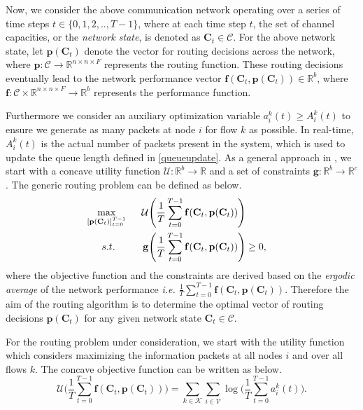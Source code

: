 \documentclass[lettersize,journal]{IEEEtran}
\begin{document}
Now, we consider the above communication network operating over a series of time steps $t \in \{0, 1, 2,..,T-1 \}$, where at each time step $t$, the set of channel capacities, or the \textit{network state}, is denoted as $\mathbf{C}_t \in \mathcal{C}$. For the above network state, let $\mathbf{p}(\mathbf{C}_t)$ denote the vector for routing decisions across the network, where $\mathbf{p}:\mathcal{C} \rightarrow \mathbb{R}^{n \times n \times F}$ represents the routing function. These routing decisions eventually lead to the network performance vector $\mathbf{f}(\mathbf{C}_t, \mathbf{p}(\mathbf{C}_t)) \in \mathbb{R}^b$, where $\mathbf{f}:\mathcal{C} \times \mathbb{R}^{n \times n \times F} \rightarrow \mathbb{R}^b$ represents the performance function.

Furthermore we consider an auxiliary optimization variable $a_i^k(t) \geq A_i^k(t)$ to ensure we generate as many packets at node $i$ for flow $k$ as possible. In real-time, $A_i^k(t)$ is the actual number of packets present in the system, which is used to update the queue length defined in \eqref{queueupdate}. As a general approach in \cite{naderializadeh2022state}, we start with a concave utility function $\mathcal{U}: \mathbb{R}^b \rightarrow \mathbb{R}$ and a set of constraints $\mathbf{g}: \mathbb{R}^b \rightarrow \mathbb{R}^c$. The generic routing problem can be defined as below.
\begin{subequations} \label{eq:concave_util}
\begin{align}
    \max_{[\mathbf{p}(\mathbf{C}_t)]_{t=0}^{T-1}} \hspace{0.5cm} \mathcal{U} \Biggl(\frac{1}{T} \sum_{t=0}^{T-1} \mathbf{f}(\mathbf{C}_t, \mathbf{p}(\mathbf{C}_t))\Biggl) \\
    s.t. \hspace{1cm} \mathbf{g}\Biggl(\frac{1}{T} \sum_{t=0}^{T-1} \mathbf{f}(\mathbf{C}_t, \mathbf{p}(\mathbf{C}_t)) \Biggl) & \geq 0,
\end{align}
\end{subequations}
where the objective function and the constraints are derived based on the \textit{ergodic average} of the network performance \textit{i.e.} $\frac{1}{T} \sum_{t=0}^{T-1} \mathbf{f}(\mathbf{C}_t, \mathbf{p}(\mathbf{C}_t))$. Therefore the aim of the routing algorithm is to determine the optimal vector of routing decisions $\mathbf{p}(\mathbf{C}_t)$ for any given network state $\mathbf{C}_t \in \mathcal{C}$. 

For the routing problem under consideration, we start with the utility function which considers maximizing the information packets at all nodes $i$ and over all flows $k$. The concave objective function can be written as below.
\begin{equation} \label{eq:util_function}
    \mathcal{U} \Biggl(\frac{1}{T} \sum_{t=0}^{T-1} \mathbf{f}(\mathbf{C}_t, \mathbf{p}(\mathbf{C}_t))\Biggl) = \sum_{k \in \mathcal{K}} \sum_{i \in \mathcal{V}} \log \Biggl(\frac{1}{T} \sum_{t=0}^{T-1} a_i^k(t) \Biggl).
\end{equation}
\end{document}
